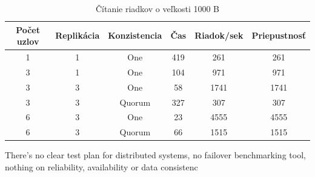 \documentclass[11pt,twoside,a4paper]{book}
\begin{document}
\begin{table}[htbp]
\begin{center}
\begin{tabular}{|c|c|c|c|c|c|}
\hline
\hline Počet uzlov & Replikácia & Konzistencia & Čas & Riadok/sek & Priepustnosť\\ 
\hline
\hline 1 & 1 & One & 419 & 261 & 261\\ 
\hline 3 & 1 & One & 104 & 971 & 971\\ 
\hline 3 & 3 & One & 58 & 1741 & 1741\\ 
\hline 3 & 3 & Quorum & 327 & 307 & 307\\ 
\hline 6 & 3 & One & 23 & 4555 & 4555\\ 
\hline 6 & 3 & Quorum & 66 & 1515 & 1515\\ 
\hline
\end{tabular} 
\end{center}
\caption{Čítanie riadkov o veľkosti 1000 B}
\label{tab:CPerf3}
\end{table}




There’s no clear test plan for distributed systems, no failover benchmarking tool, nothing on reliability, availability or data consistenc
% 



% 
% 
\end{document}
